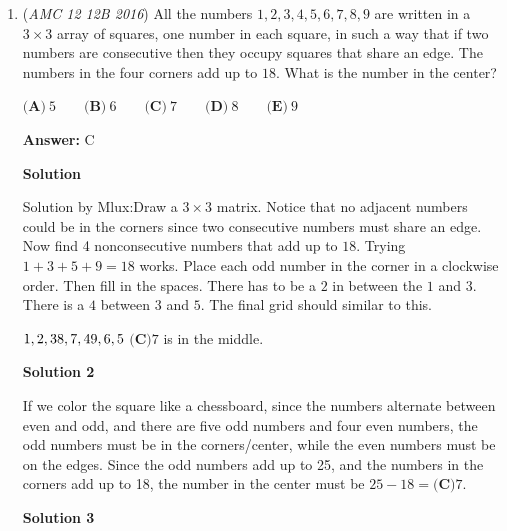 \begin{enumerate}
 Squares with length $3$ in the rightmost column start at $(2,0)$ and end at $(2,2\pi)$, so there are $4$ such squares in the right column. As the left row starts at $(1,0)$ and ends at $(1,\pi)$ there are $4+1=5$ squares with length $3$. As squares with length $4$ would not fit in the triangle, the answer is $30+15+5$ which is $\boxed{\textbf{(D)}\ 50}$.

 


	\item (\textit{AMC 12 12B 2016}) All the numbers $1, 2, 3, 4, 5, 6, 7, 8, 9$ are written in a $3\times3$ array of squares, one number in each square, in such a way that if two numbers are consecutive then they occupy squares that share an edge. The numbers in the four corners add up to $18$. What is the number in the center?


 $\textbf{(A)}\ 5\qquad\textbf{(B)}\ 6\qquad\textbf{(C)}\ 7\qquad\textbf{(D)}\ 8\qquad\textbf{(E)}\ 9$

 \textbf{Answer: }C



\textbf{Solution}

Solution by Mlux:Draw a $3\times3$ matrix. Notice that no adjacent numbers could be in the corners since two consecutive numbers must share an edge. Now find 4 nonconsecutive numbers that add up to $18$. Trying $1+3+5+9 = 18$ works. Place each odd number in the corner in a clockwise order. Then fill in the spaces. There has to be a $2$ in between the $1$ and $3$. There is a $4$ between $3$ and $5$.  The final grid should similar to this.

 $\newline 1, 2,  3\newline 8,  7, 4\newline 9,  6,  5$
$\boxed{\textbf{(C)}7}$ is in the middle.

 



\textbf{Solution 2}

If we color the square like a chessboard, since the numbers alternate between even and odd, and there are five odd numbers and four even numbers, the odd numbers must be in the corners/center, while the even numbers must be on the edges.  Since the odd numbers add up to 25, and the numbers in the corners add up to 18, the number in the center must be $25 - 18 = \boxed{\textbf{(C)}7}$.

 



\textbf{Solution 3}


\end{enumerate}
